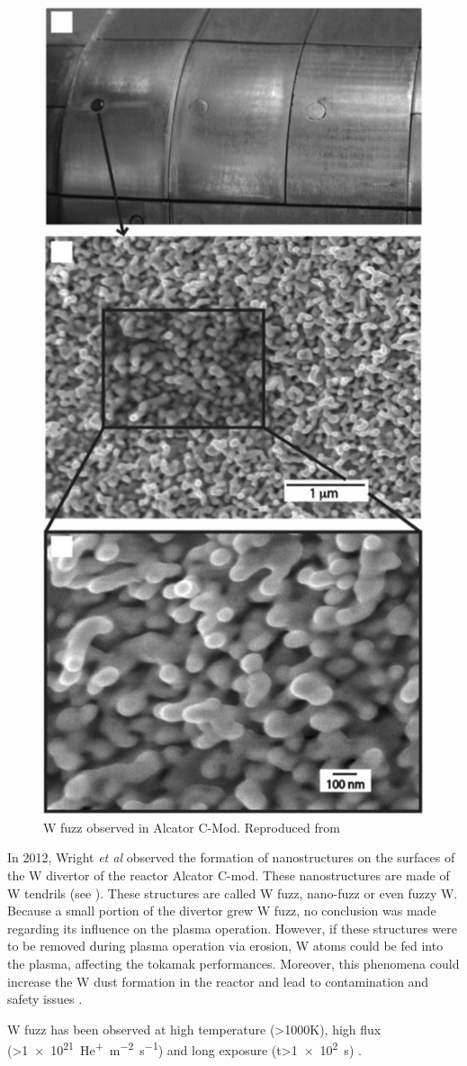 \begin{figure} [h!]
    \centering
    \includegraphics[width=0.5\linewidth]{Figures/Chapter1/fuzz_alcator_wright.jpg}
    \caption{W fuzz observed in Alcator C-Mod. Reproduced from \cite{wright_tungsten_2012}}
\end{figure}

In 2012, Wright \textit{et al}  observed the formation of nanostructures on the surfaces of the W divertor of the reactor Alcator C-mod.
These nanostructures are made of W tendrils (see ).
These structures are called W fuzz, nano-fuzz or even fuzzy W.
Because a small portion of the divertor grew W fuzz, no conclusion was made regarding its influence on the plasma operation.
However, if these structures were to be removed during plasma operation via erosion, W atoms could be fed into the plasma, affecting the tokamak performances.
Moreover, this phenomena could increase the W dust formation in the reactor and lead to contamination and safety issues .

W fuzz has been observed at high temperature (>1000K), high flux (>\SI{1e21}{He^+.m^{-2}.s^{-1}}) and long exposure (t>\SI{1e2}{s}) .

